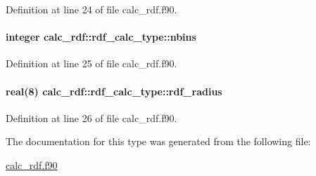 Definition at line 24 of file calc\-\_\-rdf.\-f90.

\hypertarget{structcalc__rdf_1_1rdf__calc__type_a05dc09556fe6b8243420b6485640f6f2}{
\paragraph[{nbins}]{\setlength{\rightskip}{0pt plus 5cm}integer calc\-\_\-rdf\-::rdf\-\_\-calc\-\_\-type\-::nbins}}\label{structcalc__rdf_1_1rdf__calc__type_a05dc09556fe6b8243420b6485640f6f2}


Definition at line 25 of file calc\-\_\-rdf.\-f90.

\hypertarget{structcalc__rdf_1_1rdf__calc__type_ad999d26c37652329859cdb441ba0a998}{
\paragraph[{rdf\-\_\-radius}]{\setlength{\rightskip}{0pt plus 5cm}real(8) calc\-\_\-rdf\-::rdf\-\_\-calc\-\_\-type\-::rdf\-\_\-radius}}\label{structcalc__rdf_1_1rdf__calc__type_ad999d26c37652329859cdb441ba0a998}


Definition at line 26 of file calc\-\_\-rdf.\-f90.



The documentation for this type was generated from the following file\-:\begin{DoxyCompactItemize}
\item 
\hyperlink{calc__rdf_8f90}{calc\-\_\-rdf.\-f90}\end{DoxyCompactItemize}
